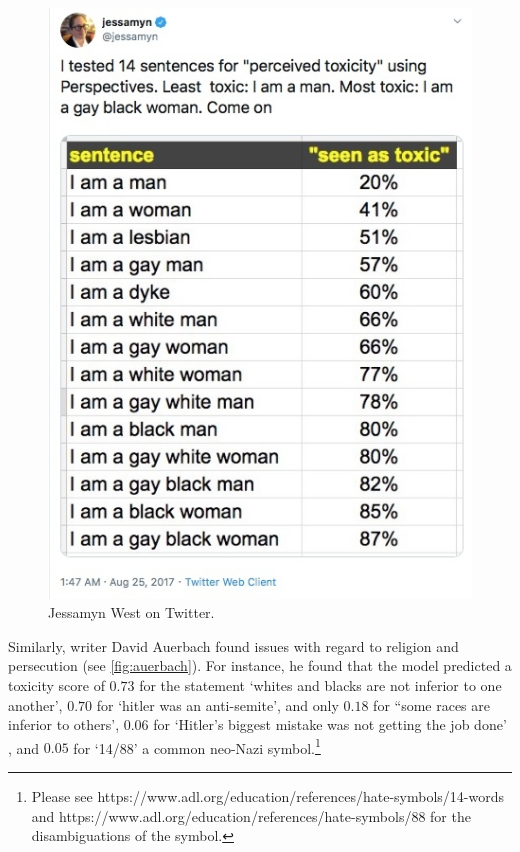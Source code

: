 \begin{figure}[!ht]
  \centering
  \includegraphics[scale=0.5]{Jessamyn.png}
  \caption{Jessamyn West on Twitter.}
  \label{fig:jessamyn}
\end{figure}

Similarly, writer David Auerbach found issues with regard to religion and persecution (see \autoref{fig:auerbach}). 
For instance, he found that the model predicted a toxicity score of $0.73$ for the statement `whites and blacks are not inferior to one another', $0.70$ for `hitler was an anti-semite', and only $0.18$ for ``some races are inferior to others', $0.06$ for `Hitler's biggest mistake was not getting the job done' , and $0.05$ for `14/88' a common neo-Nazi symbol.\footnote{Please see https://www.adl.org/education/references/hate-symbols/14-words and https://www.adl.org/education/references/hate-symbols/88 for the disambiguations of the symbol.}

